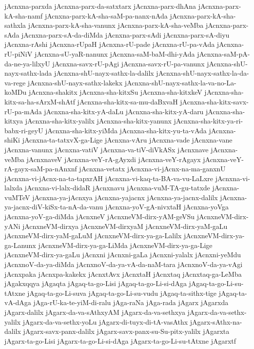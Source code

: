 {jAcnxna-parxda
jAcnxna-parx-da-satxtarx
jAcnxna-parx-dhAna
jAcnxna-parx-kA-sha-namf
jAcnxna-parx-kA-sha-saM-pa-nanx-nAda
jAcnxna-parx-kA-sha-sathxla
jAcnxna-parx-kA-sha-vanunx
jAcnxna-parx-kA-sha-veMba
jAcnxna-parx-sAda
jAcnxna-parx-sA-da-diMda
jAcnxna-parx-sAdi
jAcnxna-parx-sA-diyu
jAcnxna-rAshi
jAcnxna-rUpaH
jAcnxna-rU-pade
jAcnxna-rU-pa-vAda
jAcnxna-rU-piNiV
jAcnxna-sU-yaR-nanunx
jAcnxna-saM-baM-dhi-yAda
jAcnxna-saM-pA-da-ne-ya-lilxyU
jAcnxna-savx-rU-pAgi
jAcnxna-savx-rU-pa-vanunx
jAcnxna-shU-nayx-sathx-lada
jAcnxna-shU-nayx-sathx-la-dalilx
jAcnxna-shU-nayx-sathx-la-da-va-rege
jAcnxna-shU-nayx-sathx-lakekx
jAcnxna-shU-nayx-sathx-la-va-no-La-koMDu
jAcnxna-shakitx
jAcnxna-sha-kitxSu
jAcnxna-sha-kitxkeV
jAcnxna-sha-kitx-sa-ha-sArxM-shAtf
jAcnxna-sha-kitx-sa-mu-daBxvaH
jAcnxna-sha-kitx-savx-rU-pa-mAda
jAcnxna-sha-kitx-yA-daLu
jAcnxna-sha-kitx-yA-daru
jAcnxna-sha-kitxya
jAcnxna-sha-kitx-yalilx
jAcnxna-sha-kitx-yanunx
jAcnxna-sha-kitx-ya-ri-babx-ri-geyU
jAcnxna-sha-kitx-yiMda
jAcnxna-sha-kitx-yu-ta-vAda
jAcnxna-shiKi
jAcnxna-ta-tatxvX-ga-Lige
jAcnxna-vAru
jAcnxna-vade
jAcnxna-vane
jAcnxna-vanunx
jAcnxna-vatiV
jAcnxna-va-tiV-diVkASx
jAcnxnave
jAcnxna-veMba
jAcnxnaveV
jAcnxna-veY-rA-gAyxdi
jAcnxna-veY-rAgayx
jAcnxna-veY-rA-gayx-saM-pa-nAnxnf
jAcnxna-vetatx
jAcnxna-vi-jAcnx-na-ma-ganxnU
jAcnxna-vi-jAcnx-na-ta-tapxrAH
jAcnxna-vi-kaq-ta-BA-va-vu-LaLxre
jAcnxna-vi-lalxda
jAcnxna-vi-lalx-didaR
jAcnxnavu
jAcnxna-vuM-TA-gu-tatxde
jAcnxna-vuMTeV
jAcnxna-ya-jAcnxya
jAcnxna-yajacnx
jAcnxna-ya-jacnx-dalilx
jAcnxna-ya-jacnx-diV-kiSx-ta-nA-da-vanu
jAcnxna-yoV-gA-nivxtaH
jAcnxna-yoVga
jAcnxna-yoV-ga-diMda
jAcnxneV
jAcnxneVM-dirx-yAM-geVSu
jAcnxneVM-dirx-yANi
jAcnxneVM-dirxya
jAcnxneVM-dirxyaM
jAcnxneVM-dirx-yaM-gaLu
jAcnxneVM-dirx-yaM-gaLuM
jAcnxneVM-dirx-ya-ga-Lalilx
jAcnxneVM-dirx-ya-ga-Lanunx
jAcnxneVM-dirx-ya-ga-LiMda
jAcnxneVM-dirx-ya-ga-Lige
jAcnxneVM-dirx-ya-gaLu
jAcnxni
jAcnxni-gaLa
jAcnxni-yalalx
jAcnxni-yeMdu
jAcnxnoV-da-ya-diMda
jAcnxnoV-da-ya-vA-da-naM-tara
jAcnxnoV-da-ya-vAgi
jAcnxpaka
jAcnxpa-kakekx
jAcnxtAvx
jAcnxtaH
jAcnxtaq
jAcnxtaq-ga-LeMba
jAgakxqqya
jAgaqta
jAgaq-ta-go-Lisi
jAgaq-ta-go-Li-si-dAga
jAgaq-ta-go-Li-su-tAtxne
jAgaq-ta-go-Li-suva
jAgaq-ta-go-Li-su-vudu
jAgaq-ta-sithx-tige
jAgaq-ta-vA-dAga
jAga-rU-ka-te-yiM-di-ralu
jAga-raNa
jAga-rada
jAgarx
jAgarxda
jAgarx-dalilx
jAgarx-da-va-sAthxyAM
jAgarx-da-va-sethxya
jAgarx-da-va-sethx-yalilx
jAgarx-da-va-sethx-yoLu
jAgarx-di-tuyx-di-tA-vasAthx
jAgarx-sAthx-na-dalilx
jAgarx-savx-panx-dalilx
jAgarx-savx-panx-su-Su-pitx-yalilx
jAgarxta
jAgarx-ta-go-Lisi
jAgarx-ta-go-Li-si-dAga
jAgarx-ta-go-Li-su-tAtxne
jAgarxtf
}

